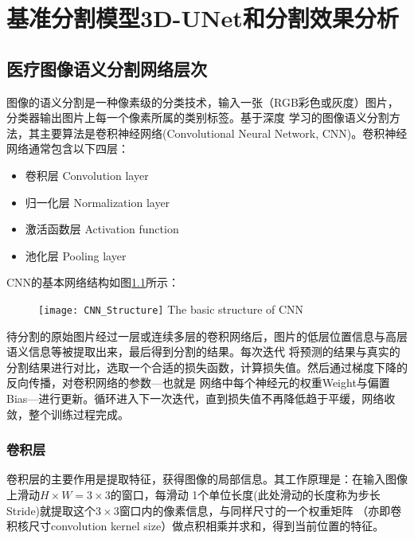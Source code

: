 
\chapter{基准分割模型3D-UNet和分割效果分析}\label{chap:baseline_model}

\section{医疗图像语义分割网络层次}

图像的语义分割是一种像素级的分类技术，输入一张（RGB彩色或灰度）图片，分类器输出图片上每一个像素所属的类别标签。基于深度
学习的图像语义分割方法，其主要算法是卷积神经网络(Convolutional Neural Network, CNN)。卷积神经网络通常包含以下四层：
\begin{itemize}
    \item 卷积层 Convolution layer
    \item 归一化层 Normalization layer
    \item 激活函数层 Activation function
    \item 池化层 Pooling layer
\end{itemize}
CNN的基本网络结构如图\ref{fig:CNN_basic_structure}所示：
\begin{figure}[!htp]
    \centering
    \texttt{[image: CNN\_Structure]}
        {The basic structure of CNN}
    \label{fig:CNN_basic_structure}
\end{figure}

\noindent{}待分割的原始图片经过一层或连续多层的卷积网络后，图片的低层位置信息与高层语义信息等被提取出来，最后得到分割的结果。每次迭代
将预测的结果与真实的分割结果进行对比，选取一个合适的损失函数，计算损失值。然后通过梯度下降的反向传播，对卷积网络的参数---也就是
网络中每个神经元的权重Weight与偏置Bias---进行更新。循环进入下一次迭代，直到损失值不再降低趋于平缓，网络收敛，整个训练过程完成。

\subsection{卷积层}
卷积层的主要作用是提取特征，获得图像的局部信息。其工作原理是：在输入图像上滑动$H \times W = 3 \times 3$的窗口，每滑动
1个单位长度(此处滑动的长度称为步长Stride)就提取这个$3 \times 3$窗口内的像素信息，与同样尺寸的一个权重矩阵
（亦即卷积核尺寸convolution kernel size）做点积相乘并求和，得到当前位置的特征。

